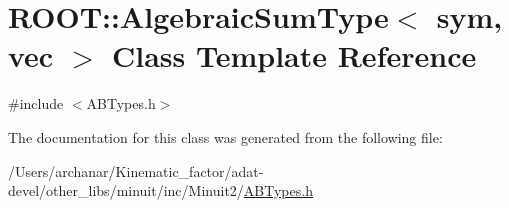 \hypertarget{classROOT_1_1Minuit2_1_1AlgebraicSumType_3_01sym_00_01vec_01_4}{}\section{R\+O\+OT\+:\+:Algebraic\+Sum\+Type$<$ sym, vec $>$ Class Template Reference}
\label{classROOT_1_1Minuit2_1_1AlgebraicSumType_3_01sym_00_01vec_01_4}


{\ttfamily \#include $<$A\+B\+Types.\+h$>$}



The documentation for this class was generated from the following file\+:\begin{DoxyCompactItemize}
\item 
/\+Users/archanar/\+Kinematic\+\_\+factor/adat-\/devel/other\+\_\+libs/minuit/inc/\+Minuit2/\mbox{\hyperlink{adat-devel_2other__libs_2minuit_2inc_2Minuit2_2ABTypes_8h}{A\+B\+Types.\+h}}\end{DoxyCompactItemize}
